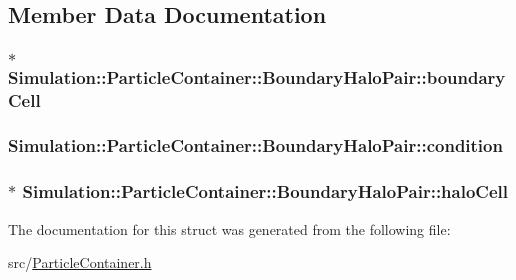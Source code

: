\subsection{Member Data Documentation}
\hypertarget{structSimulation_1_1ParticleContainer_1_1BoundaryHaloPair_a2a994d893fe6b7dbffb90868ac4bf6e0}{
\subsubsection[{boundary\-Cell}]{$\ast$ Simulation\-::\-Particle\-Container\-::\-Boundary\-Halo\-Pair\-::boundary\-Cell}}\label{structSimulation_1_1ParticleContainer_1_1BoundaryHaloPair_a2a994d893fe6b7dbffb90868ac4bf6e0}
\hypertarget{structSimulation_1_1ParticleContainer_1_1BoundaryHaloPair_acedca0aebda48d951116181435da760f}{
\subsubsection[{condition}]{ Simulation\-::\-Particle\-Container\-::\-Boundary\-Halo\-Pair\-::condition}}\label{structSimulation_1_1ParticleContainer_1_1BoundaryHaloPair_acedca0aebda48d951116181435da760f}
\hypertarget{structSimulation_1_1ParticleContainer_1_1BoundaryHaloPair_a3d91a5200497c89b6edb925f96178991}{
\subsubsection[{halo\-Cell}]{$\ast$ Simulation\-::\-Particle\-Container\-::\-Boundary\-Halo\-Pair\-::halo\-Cell}}\label{structSimulation_1_1ParticleContainer_1_1BoundaryHaloPair_a3d91a5200497c89b6edb925f96178991}


The documentation for this struct was generated from the following file\-:\begin{DoxyCompactItemize}
\item 
src/\hyperlink{ParticleContainer_8h}{Particle\-Container.\-h}\end{DoxyCompactItemize}
